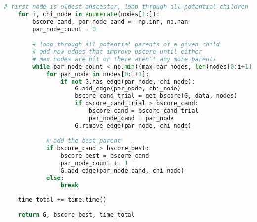 \documentclass[twoside,11pt]{article}
\begin{document}
\begin{algorithm}
\begin{lstlisting}[language=Python]
    # first node is oldest anscestor, loop through all potential children
    for i, chi_node in enumerate(nodes[1:]):
        bscore_cand, par_node_cand = -np.inf, np.nan
        par_node_count = 0

        # loop through all potential parents of a given child
        # add new edges that improve bscore until either 
        # max nodes are hit or there aren't any more parents
        while par_node_count < np.min((max_par_nodes, len(nodes[0:i+1]))):
            for par_node in nodes[0:i+1]:
                if not G.has_edge(par_node, chi_node):
                    G.add_edge(par_node, chi_node)
                    bscore_cand_trial = get_bscore(G, data, nodes)
                    if bscore_cand_trial > bscore_cand:
                        bscore_cand = bscore_cand_trial
                        par_node_cand = par_node
                    G.remove_edge(par_node, chi_node)

            # add the best parent
            if bscore_cand > bscore_best:
                bscore_best = bscore_cand
                par_node_count += 1
                G.add_edge(par_node_cand, chi_node)
            else: 
                break
    
    time_total += time.time()
                
    return G, bscore_best, time_total

\end{lstlisting}
\end{algorithm}
\end{document}
